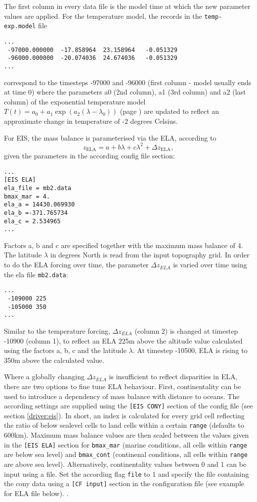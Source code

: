 The first column in every data file is the model time at which the new
parameter values are applied. For the temperature model, the records in the
\texttt{temp-exp.model} file
\begin{verbatim}
...
 -97000.000000  -17.858964  23.158964   -0.051329
 -96000.000000  -20.074036  24.674036   -0.051329
...
\end{verbatim}

correspond to the timesteps -97000 and -96000 (first column - model usually
ends at time 0) where the parameters a0 (2nd column), a1 (3rd column) and a2
(last column) of the exponential temperature model $T(t)=a_0+a_1\exp\left(a_2(\lambda-\lambda_0)\right)$
(page \pageref{driver:eis})
are updated to reflect an approximate change in temperature of -2 degrees
Celsius.

For EIS, the mass balance is parameterised via the ELA, according to
$$z_{\text{ELA}} = a + b\lambda + c\lambda^2 + \Delta z_{\text{ELA}},$$
given the parameters in the according config file section:
\begin{verbatim}
...
[EIS ELA]
ela_file = mb2.data
bmax_mar = 4.
ela_a = 14430.069930
ela_b =-371.765734
ela_c = 2.534965
...
\end{verbatim}
Factors a, b and c are specified together with the maximum mass balance of 4. The
latitude $\lambda$ in degrees North is read from the input topography grid. In
order to do the ELA forcing over time, the parameter $\Delta z_{ELA}$ is varied
over time using the ela file \texttt{mb2.data}:
\begin{verbatim}
...
 -109000 225
 -105000 350
...
\end{verbatim}

Similar to the temperature forcing, $\Delta z_{ELA}$ (column 2) is changed at
timestep -10900 (column 1), to reflect an ELA 225m above the altitude value
calculated using the factors a, b, c and the latitude $\lambda$. At timestep
-10500, ELA is rising to 350m above the calculated value.

Where a globally changing $\Delta z_{ELA}$ is insufficient to reflect
disparities in ELA, there are two options to fine tune ELA behaviour. First,
continentality can be used to introduce a dependency of mass balance with
distance to oceans. The according settings are supplied using the \texttt{[EIS CONY]}
section of the config file (see section \ref{driver:eis}).
In short, an index is calculated for every grid cell reflecting 
the ratio of below sealevel cells to land cells within a certain \texttt{range} (defaults to 600km).
Maximum mass balance values are then scaled between the values given in the \texttt{[EIS ELA]} section 
for \texttt{bmax\_mar} (marine conditions, all cells within \texttt{range} are below sea level) and
\texttt{bmax\_cont} (continenal conditions, all cells within \texttt{range} are above sea level).
Alternatively, continentality values between 0 and 1 can be input using a file. Set the according
flag \texttt{file} to 1 and specify the file containing the cony data using a \texttt{[CF input]} section
in the configuration file (see example for ELA file below).
.

